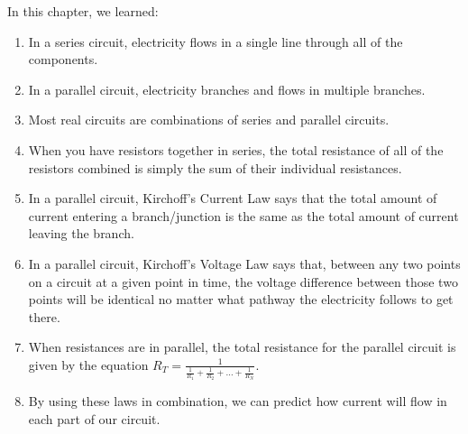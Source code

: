 In this chapter, we learned:
\begin{enumerate}
\item In a series circuit, electricity flows in a single line through all of the components.
\item In a parallel circuit, electricity branches and flows in multiple branches.
\item Most real circuits are combinations of series and parallel circuits.
\item When you have resistors together in series, the total resistance of all of the resistors combined is simply the sum of their individual resistances.
\item In a parallel circuit, Kirchoff's Current Law says that the total amount of current entering a branch/junction is the same as the total amount of current leaving the branch.
\item In a parallel circuit, Kirchoff's Voltage Law says that, between any two points on a circuit at a given point in time, the voltage difference between those two points will be identical no matter what pathway the electricity follows to get there.
\item When resistances are in parallel, the total resistance for the parallel circuit is given by the equation $R_T = \frac{1}{\frac{1}{R_1} + \frac{1}{R_2} + \ldots + \frac{1}{R_N}}$.
\item By using these laws in combination, we can predict how current will flow in each part of our circuit.
\end{enumerate}

\applysection

